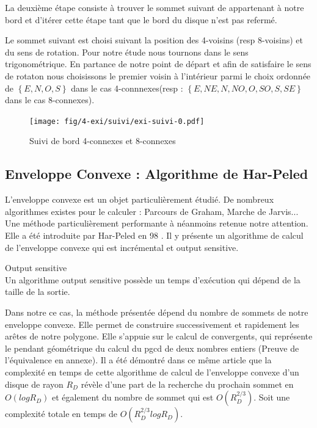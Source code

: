 La deuxième étape consiste à trouver le sommet suivant de appartenant à notre bord et d'itérer cette étape tant que le bord du disque n'est pas refermé.

Le sommet suivant est choisi suivant la position des 4-voisins (resp 8-voisins) et du sens de rotation. Pour notre étude nous tournons dans le sens trigonométrique. En partance de notre point de départ et afin de satisfaire le sens de rotaton nous choisissons le premier voisin à l'intérieur parmi le choix ordonnée de $\left\{E, N, O, S\right\}$ dans le cas 4-connnexes(resp :  $\left\{E, NE, N, NO, O, SO, S, SE \right\}$ dans le cas 8-connexes).

\begin{figure}[H]
  \centering
  \texttt{[image: fig/4-exi/suivi/exi-suivi-0.pdf]}
  \caption{Suivi de bord 4-connexes et 8-connexes}
\end{figure}
  

\subsection{Enveloppe Convexe : Algorithme de Har-Peled}

L'enveloppe convexe est un objet particulièrement étudié. De nombreux algorithmes existes pour le calculer : Parcours de Graham, Marche de Jarvis... 
Une méthode particulièrement performante à néanmoins retenue notre attention. Elle a été introduite par Har-Peled en 98 \cite{HarPeled98}. Il y présente un algorithme de calcul de l'enveloppe convexe qui est incrémental et output sensitive.


\begin{Definition}{Output sensitive}\\
\label{def:os}
      Un algorithme output sensitive possède un temps d’exécution qui dépend de la taille de la sortie.
\end{Definition}

Dans notre ce cas, la méthode présentée dépend du nombre de sommets de notre enveloppe convexe. Elle permet de construire successivement et rapidement les arêtes de notre polygone. Elle s'appuie sur le calcul de convergents, qui représente le pendant géométrique du calcul du pgcd de deux nombres entiers (Preuve de l'équivalence en annexe). Il a été démontré dans ce même article que la complexité en temps de cette algorithme de calcul de l'enveloppe convexe d'un disque de rayon $R_D$ révèle d'une part de la recherche du prochain sommet en $O(log R_D)$ et également du nombre de sommet qui est $O( R_{D}^{2/3})$. Soit une complexité totale en temps de  $O( R_{D}^{2/3} log R_D)$.

